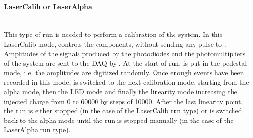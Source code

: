\paragraph{LaserCalib or LaserAlpha}~\\
This type of run is needed to perform a calibration of the \lasii{} system. In this
LaserCalib mode, \lascar{} controls the \lasii{} components, without sending any
\las{} pulse to \tilecal{}. Amplitudes of the signals produced by the photodiodes
and the photomultipliers of the \lasii{} system are sent to the \atlas{} DAQ by \lascar{}.
At the start of run, \lascar{} is put in the pedestal mode, i.e. the amplitudes
are digitized randomly. Once enough events have been recorded in this mode,
\lascar{} is switched to the next calibration mode, starting from the alpha mode, then the
LED mode and finally the linearity mode increasing the injected charge from 0 to 60000 by steps
of 10000. After the last linearity point, the run is either stopped (in the case of the
LaserCalib run type) or \lascar{} is switched back to the alpha mode until the run is stopped
manually (in the case of the LaserAlpha run type).


